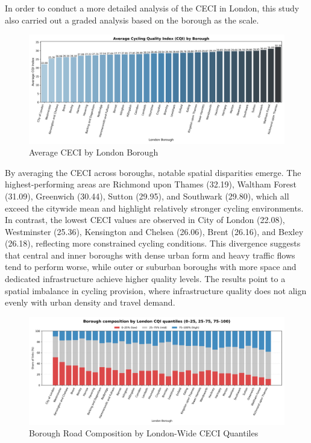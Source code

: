 \documentclass[
  12pt,
  oneside]{book}
\begin{document}
In order to conduct a more detailed analysis of the CECI in London, this study also carried out a graded analysis based on the borough as the scale.

\begin{figure}

{\centering \includegraphics[width=1\linewidth]{general_images/AverageCQIbyBorough} 

}

\caption{Average CECI by London Borough}\label{fig:AverageCQIbyBorough}
\end{figure}

By averaging the CECI across boroughs, notable spatial disparities emerge. The highest-performing areas are Richmond upon Thames (32.19), Waltham Forest (31.09), Greenwich (30.44), Sutton (29.95), and Southwark (29.80), which all exceed the citywide mean and highlight relatively stronger cycling environments. In contrast, the lowest CECI values are observed in City of London (22.08), Westminster (25.36), Kensington and Chelsea (26.06), Brent (26.16), and Bexley (26.18), reflecting more constrained cycling conditions. This divergence suggests that central and inner boroughs with dense urban form and heavy traffic flows tend to perform worse, while outer or suburban boroughs with more space and dedicated infrastructure achieve higher quality levels. The results point to a spatial imbalance in cycling provision, where infrastructure quality does not align evenly with urban density and travel demand.

\begin{figure}

{\centering \includegraphics[width=1\linewidth]{general_images/BoroughComposition} 

}

\caption{Borough Road Composition by London-Wide CECI Quantiles}\label{fig:BoroughComposition}
\end{figure}
\end{document}

